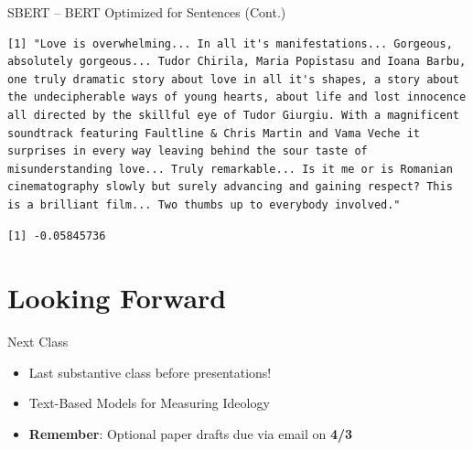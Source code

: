 \documentclass[
  ignorenonframetext,
  aspectratio=169]{beamer}
\newenvironment{Shaded}{\begin{snugshade}}{\end{snugshade}}
\newcommand{\DecValTok}[1]{\textcolor[rgb]{0.00,0.00,0.81}{#1}}
\newcommand{\NormalTok}[1]{#1}
\newcommand{\SpecialCharTok}[1]{\textcolor[rgb]{0.81,0.36,0.00}{\textbf{#1}}}
\begin{document}
\begin{frame}[fragile]{SBERT -- BERT Optimized for Sentences (Cont.)}
\begin{Shaded}
\end{Shaded}

\begin{verbatim}
[1] "Love is overwhelming... In all it's manifestations... Gorgeous, absolutely gorgeous... Tudor Chirila, Maria Popistasu and Ioana Barbu, one truly dramatic story about love in all it's shapes, a story about the undecipherable ways of young hearts, about life and lost innocence all directed by the skillful eye of Tudor Giurgiu. With a magnificent soundtrack featuring Faultline & Chris Martin and Vama Veche it surprises in every way leaving behind the sour taste of misunderstanding love... Truly remarkable... Is it me or is Romanian cinematography slowly but surely advancing and gaining respect? This is a brilliant film... Two thumbs up to everybody involved."
\end{verbatim}

\begin{Shaded}
\end{Shaded}

\begin{verbatim}
[1] -0.05845736
\end{verbatim}
\end{frame}

\section{Looking Forward}\label{looking-forward}

\begin{frame}{Next Class}
\label{next-class}
\begin{itemize}
\item Last substantive class before presentations! 
\item Text-Based Models for Measuring Ideology
\item \textbf{Remember}: Optional paper drafts due via email on \textbf{4/3}
\end{itemize}
\end{frame}
\end{document}
